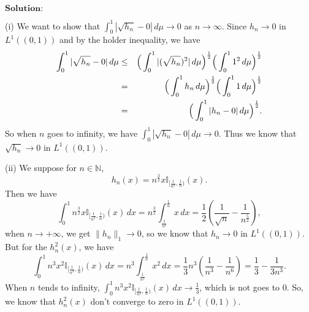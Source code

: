 \documentclass[12pt]{article}
\begin{document}
$\textbf{Solution:}$

(i) We want to show that $\int_{0}^{1} |\sqrt{h_{n}} - 0| \, d \mu \rightarrow 0$ as $n \rightarrow \infty$. Since $h_{n} \rightarrow 0$ in $L^{1}((0, 1))$ and by the holder inequality, we have
\begin{eqnarray*}
\int_{0}^{1} |\sqrt{h_{n}} - 0| \, d \mu & \leq & \Big{(} \int_{0}^{1} |(\sqrt{h_{n}})^{2}| \, d \mu \Big{)}^{\frac{1}{2}} \Big{(} \int_{0}^{1} 1^{2} \, d \mu \Big{)}^{\frac{1}{2}} \\
& = & \Big{(} \int_{0}^{1} h_{n} \, d \mu \Big{)}^{\frac{1}{2}} \Big{(} \int_{0}^{1} 1 \, d \mu \Big{)}^{\frac{1}{2}} \\
& = & \Big{(} \int_{0}^{1} |h_{n}-0| \, d \mu \Big{)}^{\frac{1}{2}}.
\end{eqnarray*}
So when $n$ goes to infinity, we have $\int_{0}^{1} |\sqrt{h_{n}} - 0| \, d \mu \rightarrow 0$. Thus we know that $\sqrt{h_{n}} \rightarrow 0$ in $L^{1}((0, 1))$.

(ii) We suppose for $n \in \mathbb{N}$,
\begin{equation*}
   h_{n} (x) = n^{\frac{3}{2}} x \mathbb{I}_{[\frac{1}{n^{2}}, \frac{1}{n})} (x).
\end{equation*}
Then we have
\begin{equation*}
   \int_{0}^{1} n^{\frac{3}{2}} x \mathbb{I}_{[\frac{1}{n^{2}}, \frac{1}{n})} (x) \, d x  = n^{\frac{3}{2}} \int_{\frac{1}{n^{2}}}^{\frac{1}{n}} x \, d x  = \frac{1}{2} (\frac{1}{\sqrt{n}} - \frac{1}{n^{\frac{5}{2}}}),
\end{equation*}
when $n \to + \infty$, we get $\|h_{n} \|_{1} \to 0$, so we know that $h_{n} \to 0$ in $L^{1}((0, 1))$. But for the $h_{n}^{2}(x)$, we have
\begin{equation*}
   \int_{0}^{1} n^{3} x^{2} \mathbb{I}_{[\frac{1}{n^{2}}, \frac{1}{n})} (x) \, d x  = n^{3} \int_{\frac{1}{n^{2}}}^{\frac{1}{n}} x^{2} \, d x  = \frac{1}{3} n^{3} (\frac{1}{n^{3}} - \frac{1}{n^{6}}) = \frac{1}{3} - \frac{1}{3 n^{3}}.
\end{equation*}
When $n$ tends to infinity, $\int_{0}^{1} n^{3} x^{2} \mathbb{I}_{[\frac{1}{n^{2}}, \frac{1}{n})} (x) \, d x \rightarrow \frac{1}{3}$, which is not goes to $0$. So, we know that $h_{n}^{2}(x)$ don't converge to zero in $L^{1}((0, 1))$. 
\end{document}
